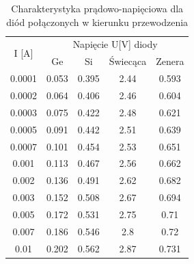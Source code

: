 \documentclass{article}
\begin{document}
\begin{table}[htbp]
\begin{center}
\begin{tabular}{|c|c|c|c|c|}
\hline
\multirow{2}{*}{I [A]} & \multicolumn{4}{c|}{Napięcie U[V] diody }\\ \cline{2-5}
 & Ge & Si & Świecąca & Zenera \\ \hline
0.0001 & 0.053 & 0.395 & 2.44 & 0.593 \\ \hline
0.0002 & 0.064 & 0.406 & 2.46 & 0.604 \\ \hline
0.0003 & 0.075 & 0.422 & 2.48 & 0.621 \\ \hline
0.0005 & 0.091 & 0.442 & 2.51 & 0.639 \\ \hline
0.0007 & 0.101 & 0.454 & 2.53 & 0.651 \\ \hline
0.001 & 0.113 & 0.467 & 2.56 & 0.662 \\ \hline
0.002 & 0.136 & 0.491 & 2.62 & 0.682 \\ \hline
0.003 & 0.152 & 0.508 & 2.67 & 0.694 \\ \hline
0.005 & 0.172 & 0.531 & 2.75 & 0.71 \\ \hline
0.007 & 0.186 & 0.546 & 2.8 & 0.72 \\ \hline
0.01 & 0.202 & 0.562 & 2.87 & 0.731 \\ \hline
\end{tabular}
\end{center}
\label{fig:table1}
\caption{Charakterystyka prądowo-napięciowa dla diód połączonych w kierunku przewodzenia}
\end{table}
\end{document}
